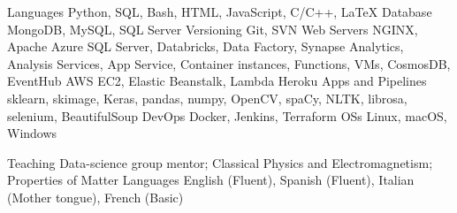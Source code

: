 

\begin{cvskills}
  \cvskill
    {Languages}
    {Python, SQL, Bash, HTML, JavaScript, C/C++, LaTeX}
  \cvskill
    {Database}
    {MongoDB, MySQL, SQL Server}
  \cvskill
    {Versioning}
    {Git, SVN}
  \cvskill
    {Web Servers}
    {NGINX, Apache}
  \cvskill
    {Azure}
    {SQL Server, Databricks, Data Factory, Synapse Analytics, Analysis Services, App Service, Container instances, Functions, VMs, CosmosDB, EventHub}
  \cvskill
    {AWS}
    {EC2, Elastic Beanstalk, Lambda}
  \cvskill
    {Heroku}
    {Apps and Pipelines}
  {sklearn, skimage, Keras, pandas, numpy, OpenCV, spaCy, NLTK, librosa, selenium, BeautifulSoup}
  \cvskill
    {DevOps}
    {Docker, Jenkins, Terraform}
  \cvskill
    {OSs}
    {Linux, macOS, Windows}
\end{cvskills}



\begin{cvskills}
  \cvskill
    {Teaching}
    {Data-science group mentor; Classical Physics and Electromagnetism; Properties of Matter}
  \cvskill
    {Languages}
    {English (Fluent), Spanish (Fluent), Italian (Mother tongue), French (Basic)}
\end{cvskills}
